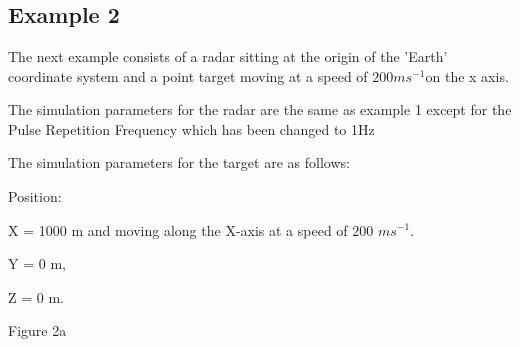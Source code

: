 \documentclass{sebase}
\begin{document}

\section{\protect\smallskip }

\subsection{Example 2}

The next example consists of a radar sitting at the origin of the 'Earth'
coordinate system and a point target moving at a speed of $200ms^{-1}$on the
x axis.

\smallskip

The simulation parameters for the radar are the same as example 1 except for
the Pulse Repetition Frequency which has been changed to 1Hz

\smallskip

\smallskip The simulation parameters for the target are as follows:

\smallskip

Position:

\smallskip

X = 1000 m and moving along the X-axis at a speed of $200$ $ms^{-1}.$

\smallskip 

Y = 0 m,

\smallskip

Z = 0 m.

\smallskip

Figure 2a

\smallskip

\smallskip

\smallskip

\smallskip

\smallskip

\smallskip

\smallskip

\smallskip

\smallskip

\smallskip

\smallskip

\smallskip

\smallskip

\smallskip

\smallskip

\smallskip

\smallskip 
\end{document}
